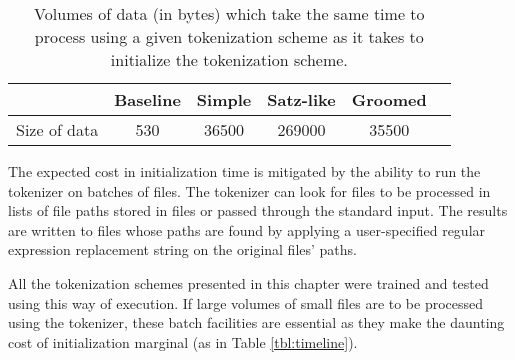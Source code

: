 \begin{table}
  \begin{center}
    \begin{tabular}{ | l | c | c | c | c | c | }
      \hline
      & Baseline & Simple & Satz-like & Groomed \\ \hline
      Size of data & 530 & 36500 & 269000 & 35500 \\
      \hline
    \end{tabular}
  \end{center}
  \caption[Time spent initializing expressed as time spent processing data]
    {Volumes of data (in bytes) which take the same time to process using a
    given tokenization scheme as it takes to initialize the tokenization
    scheme.}
  \label{tbl:init-sizes}
\end{table}

The expected cost in initialization time is mitigated by the ability to run
the tokenizer on batches of files. The tokenizer can look for files to be
processed in lists of file paths stored in files or passed through the standard
input. The results are written to files whose paths are found by applying a
user-specified regular expression replacement string on the original files'
paths.

All the tokenization schemes presented in this chapter were trained and
tested using this way of execution. If large volumes of small files are to be
processed using the tokenizer, these batch facilities are essential as they
make the daunting cost of initialization marginal (as in Table
\ref{tbl:timeline}).
